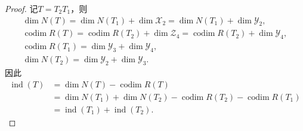 \documentclass[../../main.tex]{subfiles}%
\begin{document}
\begin{proof}
记$T=T_2T_1$，则
\begin{gather*}
\dim N(T)=\dim N(T_1)+\dim\mathscr{X}_2=\dim N(T_1)+\dim\mathscr{Y}_2,\\
\operatorname{codim}R(T)=\operatorname{codim}R(T_2)+\dim\mathscr{Z}_4=\operatorname{codim}R(T_2)+\dim\mathscr{Y}_4,\\
\operatorname{codim}R(T_1)=\dim\mathscr{Y}_3+\dim\mathscr{Y}_4,\\
\dim N(T_2)=\dim\mathscr{Y}_2+\dim\mathscr{Y}_3.
\end{gather*}
因此
\begin{align*}
\operatorname{ind}(T)&=\dim N(T)-\operatorname{codim}R(T)\\
&=\dim N(T_1)+\dim N(T_2)-\operatorname{codim}R(T_2)-\operatorname{codim}R(T_1)\\
&=\operatorname{ind}(T_1)+\operatorname{ind}(T_2).
\end{align*}

\end{proof}
\end{document}
